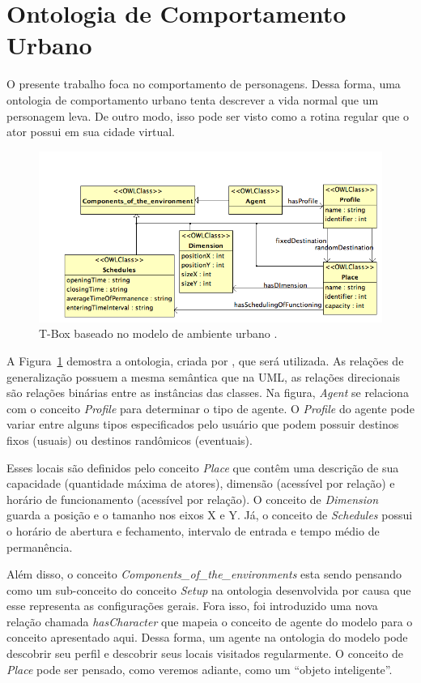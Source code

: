 \section{Ontologia de Comportamento Urbano} \label{ch:aec:ocu}

O presente trabalho foca no comportamento de personagens. Dessa forma, uma
ontologia de comportamento urbano tenta descrever a vida normal que um
personagem leva. De outro modo, isso pode ser visto como a rotina regular que
o ator possui em sua cidade virtual.

\begin{figure}[t]
  \centering
    \includegraphics[width=150mm]{figuras/uem-tbox.png}
  \caption[T-Box baseado no modelo de ambiente urbano.]{T-Box baseado no modelo de ambiente urbano \cite{paiva2005ontology}.}
  \label{fig:UEM:TBOX}
\end{figure}

A Figura~\ref{fig:UEM:TBOX} demostra a ontologia, criada por
\citet{paiva2005ontology}, que será utilizada. As relações de generalização
possuem a mesma semântica que na UML, as relações direcionais são relações
binárias entre as instâncias das classes. Na figura, \emph{Agent} se relaciona
com o conceito \emph{Profile} para determinar o tipo de agente. O
\emph{Profile} do agente pode variar entre alguns tipos especificados pelo
usuário que podem possuir destinos fixos (usuais) ou destinos randômicos
(eventuais).

Esses locais são definidos pelo conceito \emph{Place} que contêm
uma descrição de sua capacidade (quantidade máxima de atores), dimensão
(acessível por relação) e horário de funcionamento (acessível por relação). O
conceito de \emph{Dimension} guarda a posição e o tamanho nos eixos X e Y. Já,
o conceito de \emph{Schedules} possui o horário de abertura e fechamento,
intervalo de entrada e tempo médio de permanência.

Além disso, o conceito \emph{Components\_of\_the\_environments} esta sendo
pensando como um sub-conceito do conceito \emph{Setup} na ontologia
desenvolvida por causa que esse representa as configurações gerais.
%
Fora isso, foi introduzido uma nova relação chamada \emph{hasCharacter} que
mapeia o conceito de agente do modelo \occ para o conceito apresentado aqui.
Dessa forma, um agente na ontologia do
modelo \occ pode descobrir seu perfil e descobrir seus locais visitados
regularmente. O conceito de \emph{Place} pode ser pensado, como veremos
adiante, como um ``objeto inteligente''.

